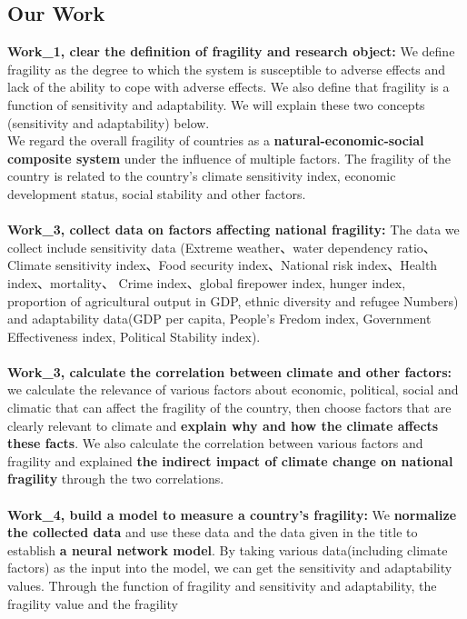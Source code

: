 \documentclass{mcmthesis}
\begin{document}
\subsection{Our Work}
  \textbf{Work\_1, clear the definition of fragility and research object:} We 
  define fragility as the degree to which the system is susceptible to adverse effects 
  and lack of the ability to cope with adverse effects. We also define that fragility 
  is a function of sensitivity and adaptability. We will explain these two concepts 
  (sensitivity and adaptability) below.\\ We regard the overall fragility of 
  countries as a \textbf{natural-economic-social composite system} under the influence of 
  multiple factors. The fragility of the country is related to the country's 
  climate sensitivity index, economic development status, social stability and 
  other factors.\\\\
  \textbf{Work\_3, collect data on factors affecting national fragility:} The data we
  collect include sensitivity data (Extreme weather、water dependency ratio、Climate
  sensitivity index、Food security index、National risk index、Health index、mortality、
  Crime index、global firepower index, hunger index,  proportion of agricultural output 
  in GDP, ethnic diversity and refugee Numbers) and adaptability data(GDP per capita, 
  People's Fredom index, Government Effectiveness index, Political Stability index).\\\\
  \textbf{Work\_3, calculate the correlation between climate and other factors:}  
  we calculate the relevance of various factors about economic, political, social and climatic 
  that can affect the fragility of the country, then choose factors that are clearly relevant 
  to climate and \textbf{explain why and how the climate affects these facts}. We also calculate the 
  correlation between various factors and fragility and explained \textbf{the indirect impact of 
  climate change on national fragility} through the two correlations.\\\\
  \textbf{Work\_4, build a model to measure a country's fragility:} We \textbf{normalize the collected 
  data} and use these data and the data given in the title to 
  establish \textbf{a neural network model}. By taking various data(including climate factors) as the 
  input into the model, we can get the sensitivity and adaptability values. Through the function 
  of fragility and sensitivity and adaptability, the fragility value and the fragility 
\end{document}
